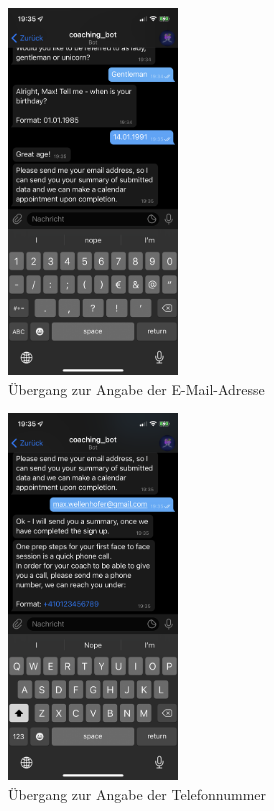 	\begin{figure}
		\centering
		\includegraphics[width=0.4\textwidth]{images/Screenshots/email.PNG}
		\caption{Übergang zur Angabe der E-Mail-Adresse}
		\label{fig: scs..email}
	\end{figure}


	\begin{figure}
		\centering
		\includegraphics[width=0.4\textwidth]{images/Screenshots/telephone.PNG}
		\caption{Übergang zur Angabe der Telefonnummer}
		\label{fig: scs..telephone}
	\end{figure}


